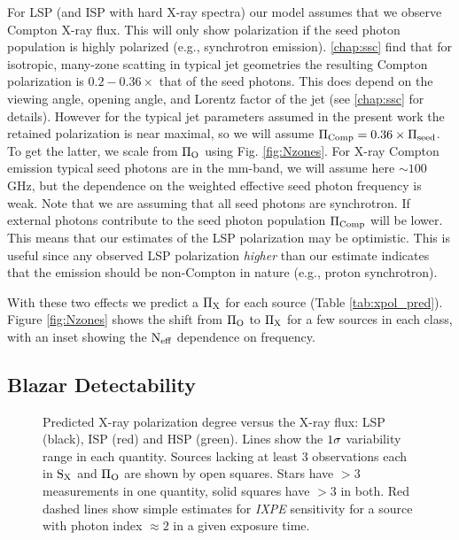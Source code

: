 For LSP (and ISP with hard X-ray spectra) our model assumes that we observe Compton X-ray flux. This will only show polarization if the seed photon population is highly polarized (e.g., synchrotron emission). 
\cref{chap:ssc} find that for isotropic, many-zone scatting in typical jet geometries
the resulting Compton polarization is $0.2-0.36\times$ that of the seed photons. This
does depend on the viewing angle, opening angle, and Lorentz factor of the jet (see \cref{chap:ssc} for details).
However for the typical jet parameters assumed in the present work \citep{liodakis_detecting_2017} the retained polarization is near
maximal, so we will assume $\Pi_{\rm Comp} = 0.36 \times \Pi_{\rm seed}$. To get the latter, we scale from
$\rm \Pi_O$ using Fig. \ref{fig:Nzones}. For X-ray Compton emission typical seed photons are
in the mm-band, we will assume here $\sim 100$\,GHz, but the dependence on the weighted 
effective seed photon frequency is weak. Note that we are assuming that all seed photons are
synchrotron. If external photons contribute to the seed photon population $\Pi_{\rm Comp}$ will be lower.
This means that our estimates of the LSP polarization may be optimistic. This is useful
since any observed LSP polarization {\it higher} than our estimate indicates that the emission
should be non-Compton in nature (e.g., proton synchrotron).


	With these two effects we predict a $\rm \Pi_X$ for each source (Table \ref{tab:xpol_pred}).
Figure \ref{fig:Nzones} shows the shift from $\rm \Pi_O$ to $\rm \Pi_X$ for a few sources in each class, 
with an inset showing the $\rm N_{\rm eff}$ dependence on frequency.

\subsection{Blazar Detectability}
\label{sec:xray_detect}

\begin{figure}
\centering
{}
\caption{Predicted X-ray polarization degree versus the X-ray flux: LSP (black), ISP (red) and HSP (green).
Lines show the $\rm 1\sigma$ variability range in each quantity. Sources lacking at least 3 observations
each in $\rm S_X$ and $\rm \Pi_O$ are shown by open squares. Stars have $>3$ measurements in one quantity, solid
squares have $>3$ in both.  Red dashed lines show simple estimates for {\it IXPE} sensitivity for a source with photon index $\approx2$
in a given exposure time.}
\label{fig:pred_ixpe}
\end{figure}

